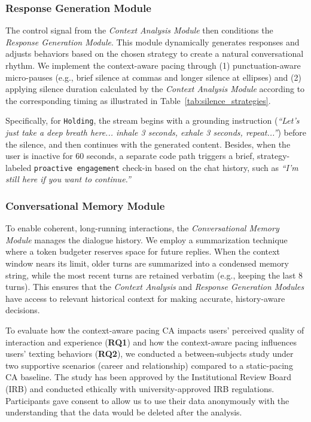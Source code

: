 \subsubsection{Response Generation Module}
The control signal from the \emph{Context Analysis Module} then conditions the \emph{Response Generation Module}. This module dynamically generates responses and adjusts behaviors based on the chosen strategy to create a natural conversational rhythm. We implement the context-aware pacing through (1) punctuation-aware micro-pauses (e.g., brief silence at commas and longer silence at ellipses) and (2) applying silence duration calculated by the \emph{Context Analysis Module} according to the corresponding timing as illustrated in Table~\ref{tab:silence_strategies}.

Specifically, for \texttt{Holding}, the stream begins with a grounding instruction (\textit{``Let's just take a deep breath here... inhale 3 seconds, exhale 3 seconds, repeat...''}) before the silence, and then continues with the generated content. Besides, when the user is inactive for 60 seconds, a separate code path triggers a brief, strategy-labeled \texttt{proactive engagement} check-in based on the chat history, such as \textit{``I'm still here if you want to continue.''}

\subsubsection{Conversational Memory Module}
To enable coherent, long-running interactions, the \emph{Conversational Memory Module} manages the dialogue history. We employ a summarization technique where a token budgeter reserves space for future replies. When the context window nears its limit, older turns are summarized into a condensed memory string, while the most recent turns are retained verbatim (e.g., keeping the last 8 turns). This ensures that the \emph{Context Analysis} and \emph{Response Generation Modules} have access to relevant historical context for making accurate, history-aware decisions.

To evaluate how the context-aware pacing CA impacts users' perceived quality of interaction and experience (\textbf{RQ1}) and how the context-aware pacing influences users' texting behaviors (\textbf{RQ2}), we conducted a between-subjects study under two supportive scenarios (career and relationship) compared to a static-pacing CA baseline. The study has been approved by the Institutional Review Board (IRB) and conducted ethically with university-approved IRB regulations. Participants gave consent to allow us to use their data anonymously with the understanding that the data would be deleted after the analysis.



